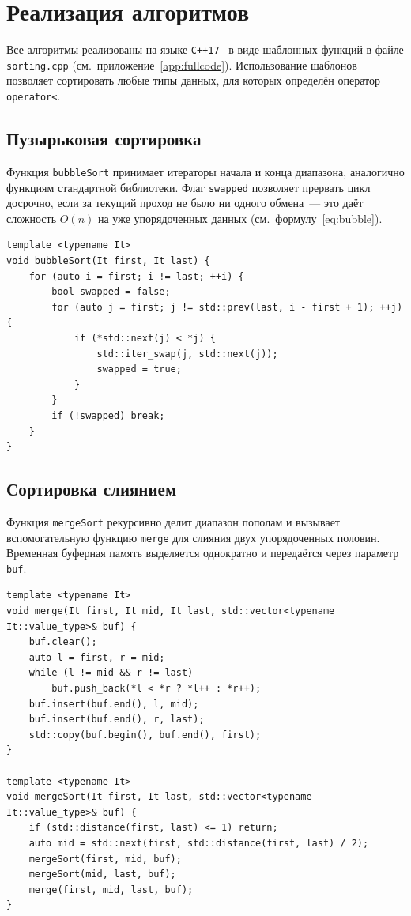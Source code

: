 \section{Реализация алгоритмов}

Все алгоритмы реализованы на языке \texttt{C++17}~\cite{Stroustrup}
в виде шаблонных функций в файле \texttt{sorting.cpp}
(см.~приложение~\ref{app:fullcode}). Использование шаблонов позволяет
сортировать любые типы данных, для которых определён оператор
\texttt{operator<}.

\subsection{Пузырьковая сортировка}

Функция \texttt{bubbleSort} принимает итераторы начала и
конца диапазона, аналогично функциям стандартной библиотеки. Флаг
\texttt{swapped} позволяет прервать цикл досрочно, если за
текущий проход не было ни одного обмена~--- это даёт сложность $O(n)$
на уже упорядоченных данных (см.~формулу~\ref{eq:bubble}).

\begin{verbatim}
template <typename It>
void bubbleSort(It first, It last) {
    for (auto i = first; i != last; ++i) {
        bool swapped = false;
        for (auto j = first; j != std::prev(last, i - first + 1); ++j) {
            if (*std::next(j) < *j) {
                std::iter_swap(j, std::next(j));
                swapped = true;
            }
        }
        if (!swapped) break;
    }
}
\end{verbatim}

\subsection{Сортировка слиянием}

Функция \texttt{mergeSort} рекурсивно делит диапазон пополам
и вызывает вспомогательную функцию \texttt{merge} для слияния
двух упорядоченных половин. Временная буферная память выделяется
однократно и передаётся через параметр \texttt{buf}.

\begin{verbatim}
template <typename It>
void merge(It first, It mid, It last, std::vector<typename It::value_type>& buf) {
    buf.clear();
    auto l = first, r = mid;
    while (l != mid && r != last)
        buf.push_back(*l < *r ? *l++ : *r++);
    buf.insert(buf.end(), l, mid);
    buf.insert(buf.end(), r, last);
    std::copy(buf.begin(), buf.end(), first);
}

template <typename It>
void mergeSort(It first, It last, std::vector<typename It::value_type>& buf) {
    if (std::distance(first, last) <= 1) return;
    auto mid = std::next(first, std::distance(first, last) / 2);
    mergeSort(first, mid, buf);
    mergeSort(mid, last, buf);
    merge(first, mid, last, buf);
}
\end{verbatim}

